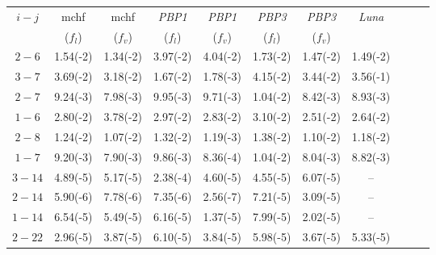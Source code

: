 %
\begin{table}
\footnotesize
\begin{center}
\begin{tabular}{@{} l *8c *2c @{}}
\toprule

\multicolumn{1}{c}{$ i - j$}    & {\sc mchf}  & {\sc mchf}  & \textit{PBP1}  & \textit{PBP1}  & \textit{PBP3}  & \textit{PBP3}  & \textit{Luna} \\
\multicolumn{1}{c}{}  & \multicolumn{1}{c}{($f_l$)}  & \multicolumn{1}{c}{($f_v$)}  &  \multicolumn{1}{c}{($f_l$)}  &  \multicolumn{1}{c}{($f_v$)} & \multicolumn{1}{c}{($f_l$)} &\multicolumn{1}{c}{($f_v$)} &\\

\toprule
 \multicolumn{1}{c}{  $2 - 6$}  &  1.54(-2) & 1.34(-2) & 3.97(-2) & 4.04(-2) & 1.73(-2) & 1.47(-2) & 1.49(-2) \\
 \multicolumn{1}{c}{ $ 3- 7$}  & 3.69(-2) & 3.18(-2) & 1.67(-2) & 1.78(-3) & 4.15(-2) & 3.44(-2) & 3.56(-1) \\
 \multicolumn{1}{c}{ $ 2 - 7$} &    9.24(-3) & 7.98(-3) & 9.95(-3) & 9.71(-3) &  1.04(-2) & 8.42(-3) & 8.93(-3) \\
 \multicolumn{1}{c}{  $1- 6$} &   2.80(-2) & 3.78(-2)& 2.97(-2) & 2.83(-2) & 3.10(-2) & 2.51(-2) & 2.64(-2) \\
 \multicolumn{1}{c}{  $2 - 8$} &  1.24(-2)  & 1.07(-2) & 1.32(-2) & 1.19(-3) & 1.38(-2)& 1.10(-2) & 1.18(-2) \\
 
 \multicolumn{1}{c}{  $1 - 7$} &   9.20(-3) &7.90(-3) & 9.86(-3) & 8.36(-4) & 1.04(-2)  & 8.04(-3) & 8.82(-3) \\
 \multicolumn{1}{c}{  $ 3- 14$} &   4.89(-5) & 5.17(-5) & 2.38(-4) & 4.60(-5) & 4.55(-5) & 6.07(-5) & --\\
 \multicolumn{1}{c}{  $2 -14 $} &   5.90(-6)  & 7.78(-6) & 7.35(-6) & 2.56(-7) &7.21(-5)  & 3.09(-5) & -- \\
 \multicolumn{1}{c}{  $1 - 14$} & 6.54(-5) & 5.49(-5)& 6.16(-5) & 1.37(-5) & 7.99(-5) & 2.02(-5) & -- \\
 \multicolumn{1}{c}{  $2- 22$} &   2.96(-5) & 3.87(-5)& 6.10(-5) & 3.84(-5) & 5.98(-5) & 3.67(-5) & 5.33(-5) \\
 

\end{tabular}
\end{center}
\end{table}
